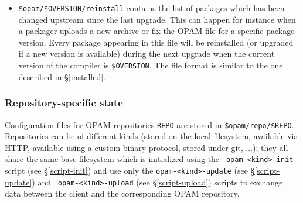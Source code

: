\documentclass[a4paper,11pt]{article}
\begin{document}
\begin{itemize}
\item \verb+$opam/$OVERSION/reinstall+ contains the list of packages
  which has been changed upstream since the last upgrade. This can
  happen for instance when a packager uploads a new archive or fix the
  OPAM file for a specific package version. Every package appearing in
  this file will be reinstalled (or upgraded if a new version is
  available) during the next upgrade when the current version of the
  compiler is \verb+$OVERSION+. The file format is similar to the one
  described in \S\ref{installed}.

\end{itemize}

\subsubsection{Repository-specific state}
\label{state-repo}

Configuration files for OPAM repositories \verb+REPO+ are stored in
\verb+$opam/repo/$REPO+. Repositories can be of different kinds
(stored on the local filesystem, available via HTTP, available using a
custom binary protocol, stored under git, $\ldots$); they all share
the same base filesystem which is initialized using the {\tt
  opam-<kind>-init} script (see \S\ref{script-init}) and use only the
{\tt opam-<kind>-update} (see \S\ref{script-update}) and {\tt
  opam-<kind>-upload} (see \S\ref{script-upload}) scripts to exchange
data between the client and the corresponding OPAM repository.
\end{document}
